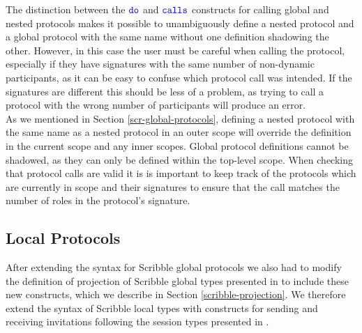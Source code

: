 \documentclass[12pt,twoside]{report}
\begin{document}
The distinction between the ${\color{blue}\mathtt{do}}$ and ${\color{blue}\mathtt{calls}}$ constructs for calling global and nested protocols makes it possible to unambiguously define a nested protocol and a global protocol with the same name without one definition shadowing the other. However, in this case the user must be careful when calling the protocol, especially if they have signatures with the same number of non-dynamic participants, as it can be easy to confuse which protocol call was intended. If the signatures are different this should be less of a problem, as trying to call a protocol with the wrong number of participants will produce an error.\\

As we mentioned in Section \ref{scr-global-protocols}, defining a nested protocol with the same name as a nested protocol in an outer scope will override the definition in the current scope and any inner scopes. Global protocol definitions cannot be shadowed, as they can only be defined within the top-level scope. When checking that protocol calls are valid it is is important to keep track of the protocols which are currently in scope and their signatures to ensure that the call matches the number of roles in the protocol's signature. 

\subsection{Local Protocols}

After extending the syntax for Scribble global protocols we also had to modify the definition of projection of Scribble global types presented in \cite{featherweight} to include these new constructs, which we describe in Section \ref{scribble-projection}. We therefore extend the syntax of Scribble local types with constructs for sending and receiving invitations following the session types presented in \cite{nestedprotocols}. \\

        
    
    
\end{document}
